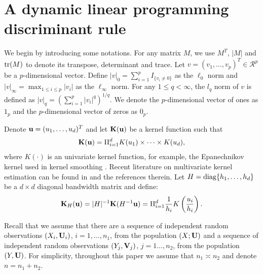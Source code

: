 \documentclass[11pt]{article}
\theoremstyle{definition}
\begin{document}
 
 
 
 \section{A dynamic linear programming discriminant rule}
 We begin by introducing some notations. For any matrix $M$, we use
 $M^T$, $|M|$ and ${\rm tr}(M)$ to denote its transpose, determinant and trace. %
 Let $v=(v_1,\ldots,v_p)^T\in
 \mathcal{R}^p$ be a $p$-dimensional vector. Define
 $|v|_0=\sum_{i=1}^pI_{\{v_i\neq 0\}}$ as the $\ell_0$ norm and $|v|_\infty=\max_{1\leq
 	i\leq p}|v_i|$ as the $\ell_\infty$ norm. For any $1\leq q<\infty$, the $l_q$ norm of $v$ is
 defined as $|v|_q=(\sum_{i=1}^p|v_i|^q)^{1/q}$. We denote the $p$-dimensional
 vector of ones as $1_p$ and the $p$-dimensional vector
 of zeros as $0_p$.
 
 Denote ${\bf u}=(u_1,\ldots, u_d)^T$ and let ${\bf K}({\bf u})$ be a kernel function such that
 \begin{eqnarray*}
 	{\bf K}({\bf u})=\Pi_{i=1}^dK(u_1)\times\cdots\times K(u_d),
 \end{eqnarray*}
 where $K(\cdot)$ is an univariate kernel function,  for example, the Epanechnikov kernel used in kernel
 smoothing \citep{Fan1996}. Recent literature on multivariate kernel estimation can be found in \cite{Gu2015} and the references therein. Let $H={\rm diag}\{h_1,\ldots, h_d\}$ be a $d\times d$ diagonal bandwidth matrix and define:
 \begin{eqnarray*}
 	{\bf K}_H({\bf u})=|H|^{-1}{\bf K}(H^{-1}{\bf u})=\Pi_{i=1}^{d}\frac{1}{h_i} K\left(\frac{u_i}{h_i}\right).
 \end{eqnarray*}
 
 Recall that we assume that there are a sequence of independent random observations $(X_i,{\bf U}_i)$, $i=1,\ldots, n_1$, from the population $(X; {\bf U})$ and a sequence of independent random observations $(Y_j, {\bf V}_j)$, $j=1\ldots, n_2$, from the population $(Y, {\bf U})$. For simplicity, throughout this paper we assume that  $n_1\asymp n_2$ and denote $n=n_1+n_2$.
 
\end{document}

